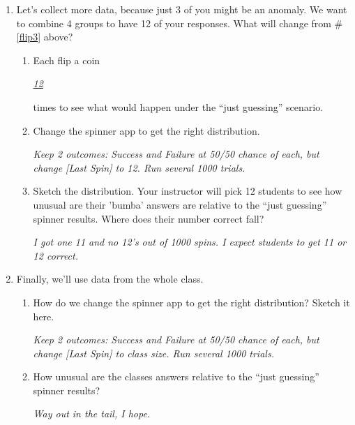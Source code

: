 \begin{enumerate}
  \item Let's collect more data, because just 3 of you might be an
    anomaly.  We want to combine 4 groups to have 12 of your
    responses. What will change from \# \ref{flip3} above? \\
    \begin{enumerate}
    \item Each flip a coin \underline{\hspace{.5in}} 
\begin{key}
   {\it \underline{12}}
\end{key}
        times to see
      what would happen under the ``just guessing'' scenario. 
    \item Change the spinner app to get the right  distribution.
\begin{students}
  \vspace{2cm}
\end{students}    
\begin{key}
   {\it Keep 2 outcomes: Success and Failure at 50/50 chance of each,
     but change [Last Spin] to 12. Run several 1000 trials. }
\end{key}
   

\item Sketch the distribution. Your instructor will pick 12 students
  to see how unusual are their 'bumba' answers are relative to the
  ``just guessing'' spinner results. Where does their number
  correct fall?
\begin{students}
  \vspace{3cm}
\end{students}    
\begin{key}
   {\it I got one 11 and no 12's out of 1000 spins. I expect students
     to get 11 or 12 correct.}
\end{key}
    \end{enumerate}


\item Finally, we'll use data from the whole class. 
    \begin{enumerate}
    \item How do we change the spinner app to get the right
      distribution?  Sketch it here.
\begin{students}
  \vspace{4cm}
\end{students}    
\begin{key}
   {\it Keep 2 outcomes: Success and Failure at 50/50 chance of each,
     but change [Last Spin] to class size. Run several 1000 trials. }
\end{key}

\item  How unusual are the classes   answers relative to the ``just guessing'' spinner results?
\begin{students}
  \vspace{2cm}
\end{students}    
\begin{key}
   {\it Way out in the tail, I hope.}
\end{key}
\end{enumerate}
\end{enumerate}


